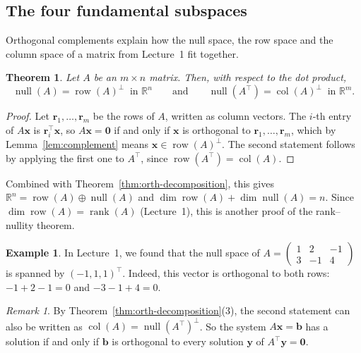 \documentclass[11pt]{article}
\theoremstyle{definition}
\newtheorem{example}[definition]{Example}
\theoremstyle{plain}
\newtheorem{theorem}[definition]{Theorem}
\theoremstyle{remark}
\newtheorem{remark}[definition]{Remark}
\DeclareMathOperator{\rank}{rank}
\DeclareMathOperator{\Null}{null}
\DeclareMathOperator{\col}{col}
\DeclareMathOperator{\row}{row}
\begin{document}
\subsection{The four fundamental subspaces}

Orthogonal complements explain how the null space, the row space and the column space of a matrix from Lecture~1 fit together.

\begin{theorem}\label{thm:fundamental-subspaces}
    Let $A$ be an $m \times n$ matrix. Then, with respect to the dot product,
    \[\Null(A) = \row(A)^\perp \ \text{ in } \mathbb{R}^n \qquad \text{and} \qquad \Null(A^\top) = \col(A)^\perp \ \text{ in } \mathbb{R}^m.\]
\end{theorem}

\begin{proof}
    Let $\mathbf{r}_1, \ldots, \mathbf{r}_m$ be the rows of $A$, written as column vectors. The $i$-th entry of $A\mathbf{x}$ is $\mathbf{r}_i^\top \mathbf{x}$, so $A\mathbf{x} = \mathbf{0}$ if and only if $\mathbf{x}$ is orthogonal to $\mathbf{r}_1, \ldots, \mathbf{r}_m$, which by Lemma~\ref{lem:complement} means $\mathbf{x} \in \row(A)^\perp$. The second statement follows by applying the first one to $A^\top$, since $\row(A^\top) = \col(A)$.
\end{proof}

Combined with Theorem~\ref{thm:orth-decomposition}, this gives $\mathbb{R}^n = \row(A) \oplus \Null(A)$ and $\dim \row(A) + \dim \Null(A) = n$. Since $\dim \row(A) = \rank(A)$ (Lecture~1), this is another proof of the rank--nullity theorem.

\begin{example}
    In Lecture~1, we found that the null space of $A = \begin{pmatrix} 1 & 2 & -1 \\ 3 & -1 & 4 \end{pmatrix}$ is spanned by $(-1, 1, 1)^\top$. Indeed, this vector is orthogonal to both rows: $-1 + 2 - 1 = 0$ and $-3 - 1 + 4 = 0$.
\end{example}

\begin{remark}
    By Theorem~\ref{thm:orth-decomposition}(3), the second statement can also be written as $\col(A) = \Null(A^\top)^\perp$. So the system $A\mathbf{x} = \mathbf{b}$ has a solution if and only if $\mathbf{b}$ is orthogonal to every solution $\mathbf{y}$ of $A^\top \mathbf{y} = \mathbf{0}$.
\end{remark}
\end{document}
